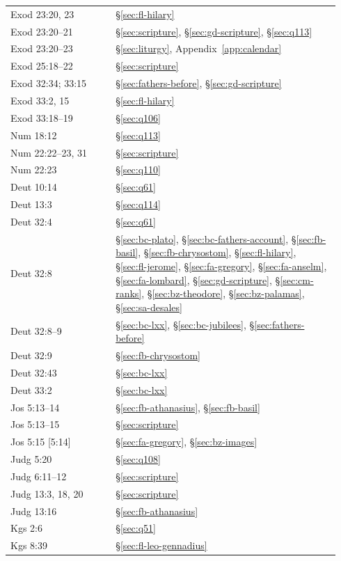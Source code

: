 \begin{longtable}{>{\raggedright\arraybackslash}p{0.30\linewidth}>{\raggedright\arraybackslash}p{0.64\linewidth}}
Exod 23:20, 23 & \S\ref{sec:fl-hilary}\\
Exod 23:20--21 & \S\ref{sec:scripture}, \S\ref{sec:gd-scripture}, \S\ref{sec:q113}\\
Exod 23:20--23 & \S\ref{sec:liturgy}, Appendix~\ref{app:calendar}\\
Exod 25:18--22 & \S\ref{sec:scripture}\\
Exod 32:34; 33:15 & \S\ref{sec:fathers-before}, \S\ref{sec:gd-scripture}\\
Exod 33:2, 15 & \S\ref{sec:fl-hilary}\\
Exod 33:18--19 & \S\ref{sec:q106}\\
Num 18:12 & \S\ref{sec:q113}\\
Num 22:22--23, 31 & \S\ref{sec:scripture}\\
Num 22:23 & \S\ref{sec:q110}\\
Deut 10:14 & \S\ref{sec:q61}\\
Deut 13:3 & \S\ref{sec:q114}\\
Deut 32:4 & \S\ref{sec:q61}\\
Deut 32:8 & \S\ref{sec:bc-plato}, \S\ref{sec:bc-fathers-account}, \S\ref{sec:fb-basil}, \S\ref{sec:fb-chrysostom}, \S\ref{sec:fl-hilary}, \S\ref{sec:fl-jerome}, \S\ref{sec:fa-gregory}, \S\ref{sec:fa-anselm}, \S\ref{sec:fa-lombard}, \S\ref{sec:gd-scripture}, \S\ref{sec:cm-ranks}, \S\ref{sec:bz-theodore}, \S\ref{sec:bz-palamas}, \S\ref{sec:sa-desales}\\
Deut 32:8--9 & \S\ref{sec:bc-lxx}, \S\ref{sec:bc-jubilees}, \S\ref{sec:fathers-before}\\
Deut 32:9 & \S\ref{sec:fb-chrysostom}\\
Deut 32:43 & \S\ref{sec:bc-lxx}\\
Deut 33:2 & \S\ref{sec:bc-lxx}\\
Jos 5:13--14 & \S\ref{sec:fb-athanasius}, \S\ref{sec:fb-basil}\\
Jos 5:13--15 & \S\ref{sec:scripture}\\
Jos 5:15 [5:14] & \S\ref{sec:fa-gregory}, \S\ref{sec:bz-images}\\
Judg 5:20 & \S\ref{sec:q108}\\
Judg 6:11--12 & \S\ref{sec:scripture}\\
Judg 13:3, 18, 20 & \S\ref{sec:scripture}\\
Judg 13:16 & \S\ref{sec:fb-athanasius}\\
1 Kgs 2:6 & \S\ref{sec:q51}\\
3 Kgs 8:39 & \S\ref{sec:fl-leo-gennadius}\\

\end{longtable}

